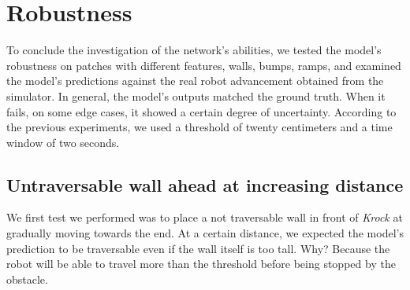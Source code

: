 \documentclass[../document.tex]{subfiles}
\begin{document}
\section{Robustness}
\label{sec: robustness}
To conclude the investigation of the network's abilities, we tested the model's robustness on patches with different features, walls, bumps, ramps, and examined the model's predictions against the real robot advancement obtained from the simulator. In general, the model's outputs matched the ground truth. When it fails, on some edge cases, it showed a certain degree of uncertainty. According to the previous experiments, we used a threshold of twenty centimeters and a time window of two seconds. 
\subsection{Untraversable wall ahead at increasing distance}
We first test we performed was to place a not traversable wall in front of \emph{Krock} at gradually moving towards the end. At a certain distance, we expected the model's prediction to be traversable even if the wall itself is too tall. Why? Because the robot will be able to travel more than the threshold before being stopped by the obstacle.
\end{document}
